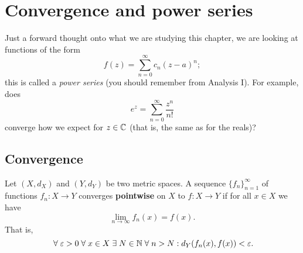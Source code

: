 \chapter{Convergence and power series}

Just a forward thought onto what we are studying this chapter, we are looking at functions of the form
\[ f(z) = \sum^{\infty}_{n=0} c_n (z - a)^n; \]
this is called a \emph{power series} (you should remember from Analysis I). For example, does
\[ e^z = \sum_{n = 0}^\infty \frac{z^n}{n!} \]
converge how we expect for $z \in \mathbb{C}$ (that is, the same as for the reals)?

\section{Convergence}

\begin{definition}
    Let $(X, d_X)$ and $(Y, d_Y)$ be two metric spaces. 
    A sequence $\{f_n\}_{n = 1}^\infty$ of functions $f_n: X \to Y$ converges \textbf{pointwise} on $X$ to $f: X \to Y$ if for all $x \in X$ we have
    \[ \lim_{n \to \infty} f_n(x) = f(x). \]
    That is,
    \[ \;\forall\; \varepsilon > 0 \;\forall\; x \in X \;\exists\; N \in \mathbb{N} \;\forall\; n > N: d_Y(f_n(x), f(x)) < \varepsilon. \]
\end{definition}

